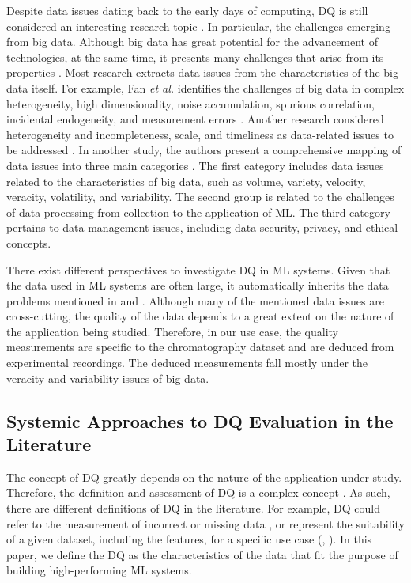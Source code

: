 Despite data issues dating back to the early days of computing, DQ is still considered an interesting research topic \cite{Gudivada2017}. In particular, the challenges emerging from big data. Although big data has great potential for the advancement of technologies, at the same time, it presents many challenges that arise from its properties \cite{Katal2013}. Most research extracts data issues from the characteristics of the big data itself. For example, Fan \emph{et al.} identifies the challenges of big data in complex heterogeneity, high dimensionality, noise accumulation, spurious correlation, incidental endogeneity, and measurement errors \cite{Fan2014}. Another research considered heterogeneity and incompleteness, scale, and timeliness as data-related issues to be addressed \cite{Ammu2013}. In another study, the authors present a comprehensive mapping of data issues into three main categories \cite{Thabet2015}. The first category includes data issues related to the characteristics of big data, such as volume, variety, velocity, veracity, volatility, and variability. The second group is related to the challenges of data processing from collection to the application of ML. The third category pertains to data management issues, including data security, privacy, and ethical concepts.  

There exist different perspectives to investigate DQ in ML systems. Given that the data used in ML systems are often large, it automatically inherits the data problems mentioned in \cite{Thabet2015} and \cite{Fan2014}. Although many of the mentioned data issues are cross-cutting, the quality of the data depends to a great extent on the nature of the application being studied. Therefore, in our use case, the quality measurements are specific to the chromatography dataset and are deduced from experimental recordings. The deduced measurements fall mostly under the veracity and variability issues of big data.

\subsection{Systemic Approaches to DQ Evaluation in the Literature}\label{sec:DQapproaches}
The concept of DQ greatly depends on the nature of the application under study. Therefore, the definition and assessment of DQ is a complex concept \cite{Gudivada2017}. As such, there are different definitions of DQ in the literature. For example, DQ could refer to the measurement of incorrect or missing data \cite{Firmani2016}, or represent the suitability of a given dataset, including the features, for a specific use case (\cite{Poon2021}, \cite{nikiforova2020}). In this paper, we define the DQ as the characteristics of the data that fit the purpose of building high-performing ML systems.


